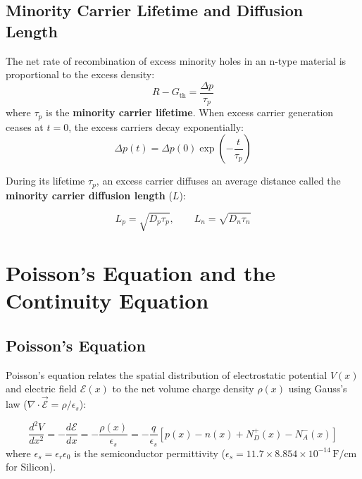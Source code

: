 \documentclass[12pt,a4paper]{article}
\begin{document}
\subsection{Minority Carrier Lifetime and Diffusion Length}
The net rate of recombination of excess minority holes in an n-type material is proportional to the excess density:
\begin{equation}
  R - G_{\text{th}} = \frac{\Delta p}{\tau_p}
\end{equation}
where $\tau_p$ is the \textbf{minority carrier lifetime}. When excess carrier generation ceases at $t=0$, the excess carriers decay exponentially:
\begin{equation}
  \Delta p(t) = \Delta p(0) \exp\left(-\frac{t}{\tau_p}\right)
\end{equation}

During its lifetime $\tau_p$, an excess carrier diffuses an average distance called the \textbf{minority carrier diffusion length} ($L$):

\begin{tcolorbox}[formulabox, title={\textbf{Diffusion Lengths}}]
\begin{equation}
  L_p = \sqrt{D_p \tau_p}, \qquad L_n = \sqrt{D_n \tau_n}
\end{equation}
\end{tcolorbox}

\section{Poisson's Equation and the Continuity Equation}

\subsection{Poisson's Equation}
Poisson's equation relates the spatial distribution of electrostatic potential $V(x)$ and electric field $\mathcal{E}(x)$ to the net volume charge density $\rho(x)$ using Gauss's law ($\nabla \cdot \vec{\mathcal{E}} = \rho/\epsilon_s$):

\begin{tcolorbox}[formulabox, title={\textbf{Poisson's Equation}}]
\begin{equation}
  \frac{d^2 V}{dx^2} = -\frac{d\mathcal{E}}{dx} = -\frac{\rho(x)}{\epsilon_s} = -\frac{q}{\epsilon_s} \left[ p(x) - n(x) + N_D^+(x) - N_A^-(x) \right]
\end{equation}
where $\epsilon_s = \epsilon_r \epsilon_0$ is the semiconductor permittivity ($\epsilon_s = 11.7 \times 8.854 \times 10^{-14}\,\text{F/cm}$ for Silicon).
\end{tcolorbox}
\end{document}
